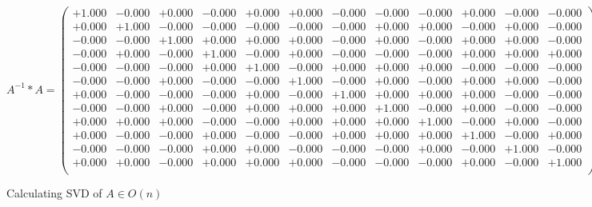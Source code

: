 \documentclass[9pt]{article}
\theoremstyle{plain}
\theoremstyle{definition}
\theoremstyle{remark}
\numberwithin{equation}{section}
\begin{document}
$A^{-1} *A = \left(
\begin{array}{
cccccccccccc}
+1.000 & -0.000 & +0.000 & -0.000 & +0.000 & +0.000 & -0.000 & -0.000 & -0.000 & +0.000 & -0.000 & -0.000 \\
+0.000 & +1.000 & -0.000 & -0.000 & -0.000 & -0.000 & -0.000 & +0.000 & +0.000 & -0.000 & +0.000 & -0.000 \\
-0.000 & -0.000 & +1.000 & +0.000 & +0.000 & +0.000 & -0.000 & +0.000 & -0.000 & +0.000 & +0.000 & -0.000 \\
-0.000 & +0.000 & -0.000 & +1.000 & -0.000 & +0.000 & -0.000 & -0.000 & -0.000 & +0.000 & +0.000 & +0.000 \\
-0.000 & -0.000 & -0.000 & +0.000 & +1.000 & -0.000 & +0.000 & +0.000 & +0.000 & -0.000 & -0.000 & -0.000 \\
-0.000 & -0.000 & +0.000 & -0.000 & -0.000 & +1.000 & -0.000 & +0.000 & -0.000 & +0.000 & +0.000 & -0.000 \\
+0.000 & -0.000 & -0.000 & -0.000 & +0.000 & -0.000 & +1.000 & +0.000 & +0.000 & +0.000 & -0.000 & -0.000 \\
-0.000 & -0.000 & +0.000 & -0.000 & +0.000 & +0.000 & +0.000 & +1.000 & -0.000 & +0.000 & -0.000 & -0.000 \\
+0.000 & +0.000 & +0.000 & -0.000 & -0.000 & +0.000 & +0.000 & +0.000 & +1.000 & -0.000 & +0.000 & -0.000 \\
+0.000 & -0.000 & -0.000 & +0.000 & -0.000 & -0.000 & +0.000 & +0.000 & +0.000 & +1.000 & -0.000 & +0.000 \\
-0.000 & -0.000 & -0.000 & +0.000 & +0.000 & -0.000 & -0.000 & -0.000 & +0.000 & -0.000 & +1.000 & -0.000 \\
+0.000 & +0.000 & -0.000 & +0.000 & +0.000 & +0.000 & -0.000 & -0.000 & -0.000 & +0.000 & -0.000 & +1.000 \\
\end{array}
\right)$ \newline 

Calculating SVD of  $A \in O(n)$
\end{document}
